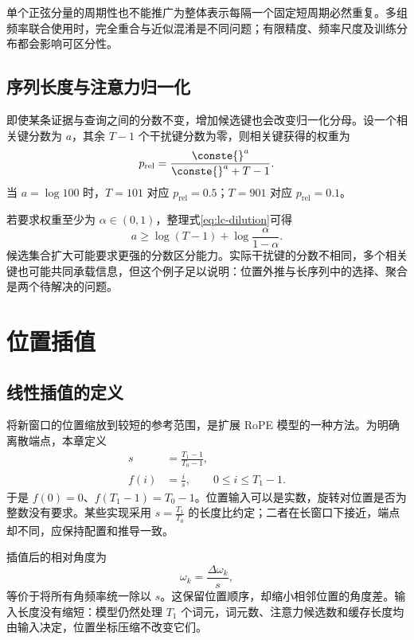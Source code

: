 \documentclass[../textbook.tex]{subfiles}
\begin{document}
单个正弦分量的周期性也不能推广为整体表示每隔一个固定短周期必然重复。多组频率联合使用时，完全重合与近似混淆是不同问题；有限精度、频率尺度及训练分布都会影响可区分性。

\subsection{序列长度与注意力归一化}
即使某条证据与查询之间的分数不变，增加候选键也会改变归一化分母。设一个相关键分数为 $a$，其余 $T-1$ 个干扰键分数为零，则相关键获得的权重为
\begin{equation}\label{eq:lc-dilution}
 p_{\mathrm{rel}}=\frac{\conste{}^a}{\conste{}^a+T-1}.
\end{equation}
当 $a=\log100$ 时，$T=101$ 对应 $p_{\mathrm{rel}}=0.5$；$T=901$ 对应 $p_{\mathrm{rel}}=0.1$。

若要求权重至少为 $\alpha\in(0,1)$，整理式\eqref{eq:lc-dilution}可得
\begin{equation}
 a\ge\log(T-1)+\log\frac{\alpha}{1-\alpha}.
\end{equation}
候选集合扩大可能要求更强的分数区分能力。实际干扰键的分数不相同，多个相关键也可能共同承载信息，但这个例子足以说明：位置外推与长序列中的选择、聚合是两个待解决的问题。

\section{位置插值}

\subsection{线性插值的定义}
将新窗口的位置缩放到较短的参考范围，是扩展 RoPE 模型的一种方法\cite{chen2023positioninterpolation}。为明确离散端点，本章定义
\begin{equation}\label{eq:lc-pi}
 \begin{aligned}
  s&=\frac{T_1-1}{T_0-1},\\
  f(i)&=\frac{i}{s},\qquad 0\le i\le T_1-1.
 \end{aligned}
\end{equation}
于是 $f(0)=0$、$f(T_1-1)=T_0-1$。位置输入可以是实数，旋转对位置是否为整数没有要求。某些实现采用 $s=\frac{T_1}{T_0}$ 的长度比约定；二者在长窗口下接近，端点却不同，应保持配置和推导一致。

插值后的相对角度为
\begin{equation}
 [f(j)-f(i)]\omega_k=\frac{\Delta\omega_k}{s},
\end{equation}
等价于将所有角频率统一除以 $s$。这保留位置顺序，却缩小相邻位置的角度差。输入长度没有缩短：模型仍然处理 $T_1$ 个词元，词元数、注意力候选数和缓存长度均由输入决定，位置坐标压缩不改变它们。
\end{document}
